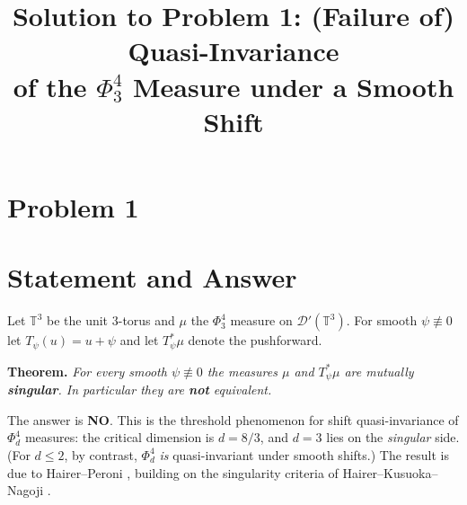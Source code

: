 \clearpage
\section*{Problem 1}
\begingroup
\hypersetup{colorlinks=true,
            linkcolor=blue!50!black,
            citecolor=blue!50!black,
            urlcolor=blue!50!black}
\newcommand{\qoneT}{\mathbb{T}}
\newcommand{\qoneR}{\mathbb{R}}
\newcommand{\qoneN}{\mathbb{N}}
\newcommand{\qoneC}{\mathcal{C}}
\newcommand{\qoneD}{\mathcal{D}}
\newcommand{\qoneE}{\mathbb{E}}
\newcommand{\qoneHp}{H}      %
\newcommand{\qonePN}{P_N}
\newcommand{\qoneLin}{\mathbf{l}}   %
\newcommand{\qoneLsq}{\mathbf{q}}   %
\newcommand{\qoneLcb}{\mathbf{c}}   %
\newcommand{\qoneIqc}{\mathbf{C}}   %
\newtheorem{qonetheorem}{Theorem}
\newtheorem{qonelemma}{Lemma}
\newtheorem{qoneproposition}{Proposition}
\newtheorem{qonecorollary}{Corollary}
\newtheorem{remark}{Remark}
\title{Solution to Problem 1: (Failure of) Quasi-Invariance\\
of the $\Phi^4_3$ Measure under a Smooth Shift}
\author{}
\date{}
\maketitle

\section*{Statement and Answer}

Let $\qoneT^3$ be the unit $3$-torus and $\mu$ the $\Phi^4_3$ measure on
$\qoneD'(\qoneT^3)$. For smooth $\psi\not\equiv0$ let $T_\psi(u)=u+\psi$ and let
$T_\psi^*\mu$ denote the pushforward.

\medskip
\noindent\textbf{Theorem.} \emph{For every smooth $\psi\not\equiv0$ the measures $\mu$
and $T_\psi^*\mu$ are mutually \textbf{singular}. In particular they are \textbf{not}
equivalent.}

\medskip
\noindent The answer is \textbf{NO}. This is the threshold phenomenon for shift
quasi-invariance of $\Phi^4_d$ measures: the critical dimension is $d=8/3$, and $d=3$
lies on the \emph{singular} side. (For $d\le 2$, by contrast, $\Phi^4_d$ \emph{is}
quasi-invariant under smooth shifts.) The result is due to Hairer--Peroni
\cite{HP25}, building on the singularity criteria of Hairer--Kusuoka--Nagoji
\cite{HKN24}.

